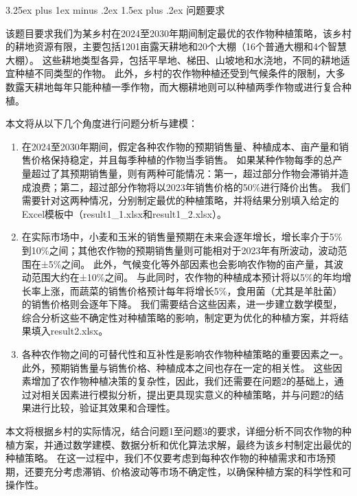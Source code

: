 \documentclass[12pt,a4paper]{nmmcm}
\makeatletter
\renewcommand\subsection{\@startsection{subsection}{2}{0pt}%
    {3.25ex plus 1ex minus .2ex}%
    {1.5ex plus .2ex}%
    {\normalfont\Large\bfseries}}
\makeatother
\begin{document}
\subsection{问题要求}

该题目要求我们为某乡村在2024至2030年期间制定最优的农作物种植策略，该乡村的耕地资源有限，主要包括1201亩露天耕地和20个大棚（16个普通大棚和4个智慧大棚）。
这些耕地类型各异，包括平旱地、梯田、山坡地和水浇地，不同的耕地适宜种植不同类型的作物。
此外，乡村的农作物种植还受到气候条件的限制，大多数露天耕地每年只能种植一季作物，而大棚耕地则可以种植两季作物或进行复合种植。


本文将从以下几个角度进行问题分析与建模：
\begin{enumerate}
  \item
        在2024至2030年期间，假定各种农作物的预期销售量、种植成本、亩产量和销售价格保持稳定，并且每季种植的作物当季销售。
        如果某种作物每季的总产量超过了其预期销售量，则有两种可能情况：第一，超过部分作物会滞销并造成浪费；第二，超过部分作物将以2023年销售价格的50\%进行降价出售。
        我们需要针对这两种情况，分别制定最优的种植策略，并将结果分别填入给定的Excel模板中（result1\_1.xlsx和result1\_2.xlsx）。


  \item
        在实际市场中，小麦和玉米的销售量预期在未来会逐年增长，增长率介于5\%到10\%之间；其他农作物的预期销售量则可能相对于2023年有所波动，波动范围在±5\%之间。
        此外，气候变化等外部因素也会影响农作物的亩产量，其波动范围大约在±10\%之间。
        与此同时，农作物的种植成本预计将以5\%的年均增长率上涨，而蔬菜的销售价格预计每年将增长5\%，食用菌（尤其是羊肚菌）的销售价格则会逐年下降。
        我们需要结合这些因素，进一步建立数学模型，综合分析这些不确定性对种植策略的影响，制定更为优化的种植方案，并将结果填入result2.xlsx。


  \item
        各种农作物之间的可替代性和互补性是影响农作物种植策略的重要因素之一。
        此外，预期销售量与销售价格、种植成本之间也存在一定的相关性。
        这些因素增加了农作物种植决策的复杂性，因此，我们还需要在问题2的基础上，通过对相关因素进行模拟分析，提出更具现实意义的种植策略，并与问题2的结果进行比较，验证其效果和合理性。

\end{enumerate}

本文将根据乡村的实际情况，结合问题1至问题3的要求，详细分析不同农作物的种植方案，并通过数学建模、数据分析和优化算法求解，最终为该乡村制定出最优的种植策略。
在这一过程中，我们不仅要考虑到每种农作物的种植需求和市场预期，还要充分考虑滞销、价格波动等市场不确定性，以确保种植方案的科学性和可操作性。
\end{document}
